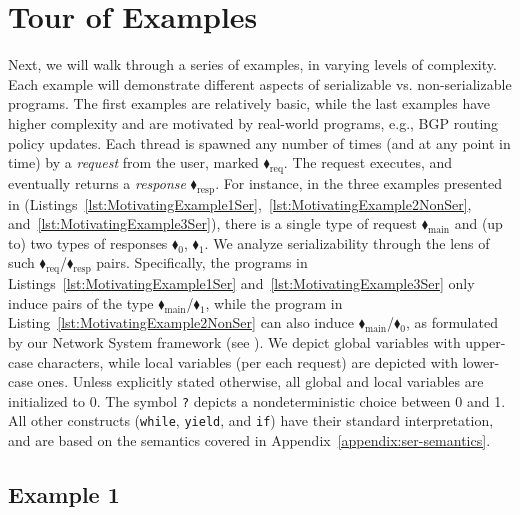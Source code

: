 \appendix


\section{Tour of Examples}
\label{appendix:tour}


Next, we will walk through a series of examples, in varying levels of complexity. Each example will demonstrate different aspects of serializable vs. non-serializable programs.
%
The first examples are relatively basic, while the last examples have higher complexity and are motivated by real-world programs, e.g., BGP routing policy updates.
%
Each thread is spawned any number of times (and at any point in time) by a \textit{request} from the user, marked {\color{ForestGreen}$\blacklozenge_\text{req}$}. The request executes, and eventually returns a \textit{response}  {\color{red}$\blacklozenge_\text{resp}$}.
%
For instance, in the three examples presented in  (Listings~\ref{lst:MotivatingExample1Ser},~\ref{lst:MotivatingExample2NonSer}, and~\ref{lst:MotivatingExample3Ser}), there is a single type of request {\color{ForestGreen}$\blacklozenge_\text{main}$} and (up to) two types of responses {\color{red}$\blacklozenge_0$}, {\color{red}$\blacklozenge_1$}.
% 
We analyze serializability through the lens of such {\color{ForestGreen}$\blacklozenge_\text{req}$}/{\color{red}$\blacklozenge_\text{resp}$} pairs. Specifically, the programs in Listings~\ref{lst:MotivatingExample1Ser} and~\ref{lst:MotivatingExample3Ser} only induce pairs of the type {\color{ForestGreen}$\blacklozenge_\text{main}$}/{\color{red}$\blacklozenge_1$}, while the program in Listing~\ref{lst:MotivatingExample2NonSer} can also induce {\color{ForestGreen}$\blacklozenge_\text{main}$}/{\color{red}$\blacklozenge_0$}, as formulated by our Network System framework (see ). 
%
We depict global variables with upper-case characters, while local variables (per each request) are depicted with lower-case ones.
%
Unless explicitly stated otherwise, all global and local variables are initialized to 0.
%
The symbol \texttt{?} depicts a nondeterministic choice between 0 and 1. All other constructs (\texttt{while}, \texttt{yield}, and \texttt{if}) have their standard interpretation, and are based on the \toolname{} semantics covered in Appendix~\ref{appendix:ser-semantics}.

\subsection{Example 1}

